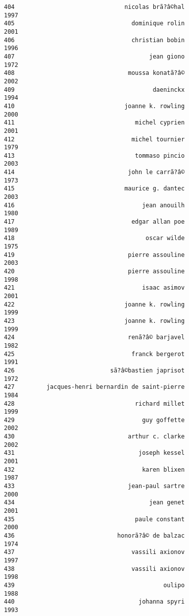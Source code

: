 \documentclass[
]{report}
\begin{document}
\begin{verbatim}
404                               nicolas brã?â©hal                1997
405                                 dominique rolin                2001
406                                 christian bobin                1996
407                                      jean giono                1972
408                                moussa konatã?â©                2002
409                                       daeninckx                1994
410                               joanne k. rowling                2000
411                                  michel cyprien                2001
412                                 michel tournier                1979
413                                  tommaso pincio                2003
414                                john le carrã?â©                1973
415                               maurice g. dantec                2003
416                                    jean anouilh                1980
417                                 edgar allan poe                1989
418                                     oscar wilde                1975
419                                pierre assouline                2003
420                                pierre assouline                1998
421                                    isaac asimov                2001
422                               joanne k. rowling                1999
423                               joanne k. rowling                1999
424                                renã?â© barjavel                1982
425                                 franck bergerot                1991
426                           sã?â©bastien japrisot                1972
427         jacques-henri bernardin de saint-pierre                1984
428                                  richard millet                1999
429                                    guy goffette                2002
430                                arthur c. clarke                2002
431                                   joseph kessel                2001
432                                    karen blixen                1987
433                                jean-paul sartre                2000
434                                      jean genet                2001
435                                  paule constant                2000
436                             honorã?â© de balzac                1974
437                                 vassili axionov                1997
438                                 vassili axionov                1998
439                                          oulipo                1988
440                                   johanna spyri                1993

\end{verbatim}
\end{document}
